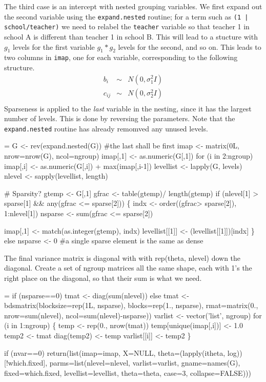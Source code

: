 \documentclass{article}
\begin{document}
The third case is an intercept with nested grouping variables.
We first expand out the second variable using the \Verb!expand.nested!
routine; for a term such as
\Verb!(1 | school/teacher)! we need to relabel the \Verb?teacher? variable
so that teacher 1 in school A is different than teacher 1 in school
B.
This will lead to a stucture with $g_1$ levels for the first variable
$g_1*g_2$ levels for the second, and so on. 
This leads to two columns in \Verb!imap!, one
for each variable, corresponding to the following structure.
\begin{eqnarray*}
 b_i &\sim & N(0, \sigma_1^2 I) \\
 c_{ij} &\sim & N(0, \sigma_2^2 I)\\
\end{eqnarray*}
Sparseness is applied to the \emph{last} variable in the nesting, since
it has the largest number of levels.
This is done by reversing the parameters.
Note that the \Verb!expand.nested! routine
has already remomved any unused levels.
\begin{nwchunk}
=
 G <- rev(expand.nested(G))  #the last shall be first
 imap <- matrix(0L, nrow=nrow(G), ncol=ngroup)
 imap[,1] <- as.numeric(G[,1])
 for (i in 2:ngroup) 
     imap[,i] <- as.numeric(G[,i]) + max(imap[,i-1])
 levellist <- lapply(G, levels)
 nlevel <- sapply(levellist, length)
 
 # Sparsity?
 gtemp <- G[,1]
 gfrac <- table(gtemp)/ length(gtemp)
 if (nlevel[1] > sparse[1] && any(gfrac <= sparse[2])) \{
     indx <- order((gfrac> sparse[2]), 1:nlevel[1])
     nsparse <- sum(gfrac <= sparse[2])
 
     imap[,1] <- match(as.integer(gtemp), indx) 
     levellist[[1]] <- (levellist[[1]])[indx]
     \}
 else  nsparse <- 0  #a single sparse element is the same as dense
\end{nwchunk}

The final variance matrix is diagonal with with rep(theta, nlevel)
down the diagonal.  Create a set of ngroup matrices all the same shape,
each with 1's the right place on the diagonal, so that their sum is %
what we need.
\begin{nwchunk}
=
 if (nsparse==0) tmat <- diag(sum(nlevel))
 else tmat <- bdsmatrix(blocksize=rep(1L, nsparse), blocks=rep(1., nsparse),
                    rmat=matrix(0., nrow=sum(nlevel), ncol=sum(nlevel)-nsparse))
 varlist <- vector('list', ngroup) 
 for (i in 1:ngroup) \{
     temp <- rep(0., nrow(tmat))
     temp[unique(imap[,i])] <- 1.0
     temp2 <- tmat
     diag(temp2) <- temp
     varlist[[i]] <- temp2
     \}
 
 if (nvar==0) 
     return(list(imap=imap, X=NULL, 
                 theta=(lapply(itheta, log))[!which.fixed],
                 parms=list(nlevel=nlevel, varlist=varlist, gname=names(G),
                            fixed=which.fixed, levellist=levellist, 
                            theta=theta, case=3, collapse=FALSE)))           
\end{nwchunk}
\end{document}
